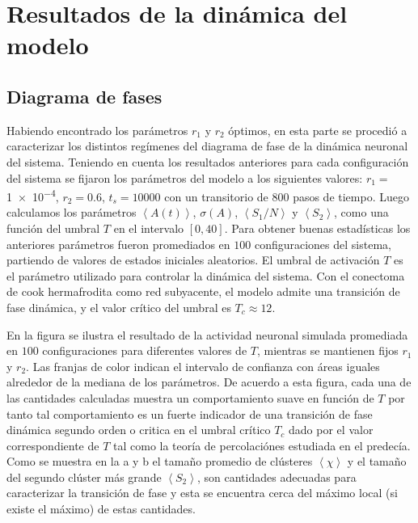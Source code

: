 \section{Resultados de la  dinámica del modelo}


\subsection{Diagrama de fases}

Habiendo encontrado los parámetros $r_1$ y $r_2$ óptimos, en esta parte se  procedió  a caracterizar los distintos regímenes del diagrama de fase de la dinámica neuronal del sistema. Teniendo en cuenta los resultados anteriores para cada  configuración del sistema se fijaron  los parámetros del modelo a los siguientes valores: $r_1=$\num{1e-4}, $r_ 2 =0.6$,  $t_s = 10000$ con un transitorio de $800$ pasos de tiempo. Luego calculamos los parámetros $\left\langle   A(t) \right\rangle $,  $\sigma(A)$, $\left\langle S_1/N \right\rangle $ y $\left\langle S_2\right\rangle $, como una función del umbral $T$ en el intervalo  $[0, 40]$.  Para obtener buenas estadísticas los anteriores parámetros fueron promediados  en $100$ configuraciones del sistema, partiendo de valores de estados iniciales aleatorios. El umbral de activación $T$ es el parámetro utilizado para controlar la dinámica del sistema. Con el conectoma de cook hermafrodita como red subyacente, el modelo admite una transición de fase dinámica, y el valor crítico del umbral es $T_c\approx12$.


En la figura  se ilustra el resultado de la actividad neuronal simulada promediada en $100$ configuraciones para diferentes valores de $T$, mientras se mantienen fijos $r_1$ y $r_2$.  Las franjas de color indican el intervalo de confianza con áreas iguales alrededor de la mediana de los parámetros. De acuerdo a esta figura, cada una de las  cantidades calculadas muestra un comportamiento suave en función de $T$ por tanto tal comportamiento es un fuerte indicador de una transición de fase dinámica  segundo orden o critica  en el umbral crítico $T_c$ dado por el valor correspondiente de $T$ tal como  la teoría  de percolaciónes estudiada en el  predecía.   Como se muestra en la  a y  b  el tamaño promedio de clústeres $\left\langle \chi \right\rangle $ y el tamaño del segundo clúster  más grande $\left\langle S_2\right\rangle $, son   cantidades adecuadas para caracterizar la transición de fase y esta se encuentra cerca del máximo local (si existe el máximo) de estas cantidades. 


